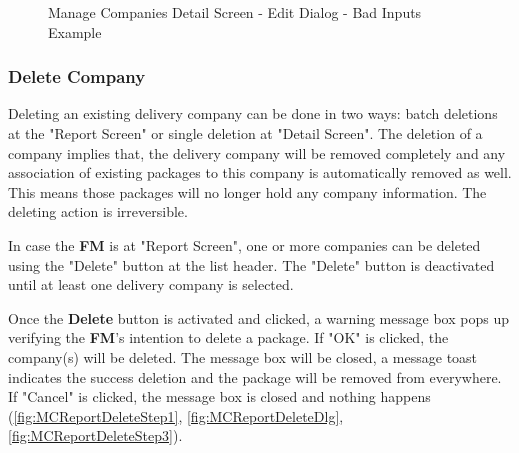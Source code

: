 \begin{figure}[H]
	\centering
    \vspace{5pt}
    \hspace{5pt}
    \caption{Manage Companies Detail Screen - Edit Dialog - Bad Inputs Example}
	\label{fig:MCDetailEditDlgBad}
\end{figure}

\subsubsection{Delete Company}

Deleting an existing delivery company can be done in two ways: batch deletions at the "Report Screen" or single deletion at "Detail Screen". The deletion of a company implies that, the delivery company will be removed completely and any association of existing packages to this company is automatically removed as well. This means those packages will no longer hold any company information. The deleting action is irreversible. 

In case the \textbf{FM} is at "Report Screen", one or more companies can be deleted using the "Delete" button at the list header. The "Delete" button is deactivated until at least one delivery company is selected.

Once the \textbf{Delete} button is activated and clicked, a warning message box pops up verifying the \textbf{FM}'s intention to delete a package. If "OK" is clicked, the company(s) will be deleted. The message box will be closed, a message toast indicates the success deletion and the package will be removed from everywhere. If "Cancel" is clicked, the message box is closed and nothing happens (\autoref{fig:MCReportDeleteStep1}, \autoref{fig:MCReportDeleteDlg}, 
\autoref{fig:MCReportDeleteStep3}).


